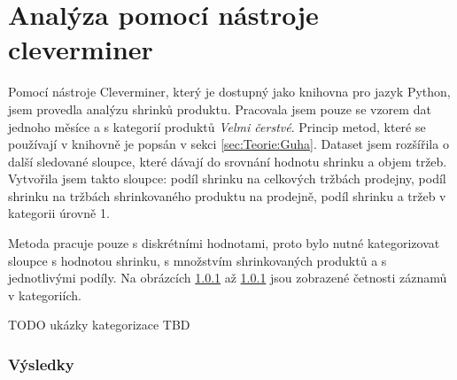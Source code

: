\chapter{Analýza pomocí nástroje cleverminer}
\label{ch:cleverminer}

Pomocí nástroje Cleverminer, který je dostupný jako knihovna pro jazyk Python, jsem provedla analýzu shrinků produktu. Pracovala jsem pouze se vzorem dat jednoho měsíce a s kategorií produktů \emph{Velmi čerstvé}. Princip metod, které se používají v knihovně je popsán v sekci \ref*{sec:Teorie:Guha}. Dataset jsem rozšířila o další sledované sloupce, které dávají do srovnání hodnotu shrinku a objem tržeb. Vytvořila jsem takto sloupce: podíl shrinku na celkových tržbách prodejny, podíl shrinku na tržbách shrinkovaného produktu na prodejně, podíl shrinku a tržeb v kategorii úrovně 1.

Metoda pracuje pouze s diskrétními hodnotami, proto bylo nutné kategorizovat sloupce s hodnotou shrinku, s množstvím shrinkovaných produktů a s jednotlivými podíly. Na obrázcích \ref*{} až \ref{} jsou zobrazené četnosti záznamů v kategoriích.

TODO ukázky kategorizace TBD %

\subsection{Výsledky}